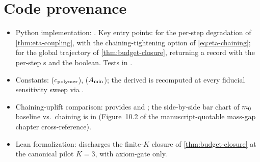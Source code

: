 \section{Code provenance}
\label{sec:sigma-hat-codeanchor}

\begin{itemize}
  \item Python implementation:
    .  Key entry
    points:  for the per-step degradation
    of \cref{thm:eta-coupling}, with the chaining-tightening
    option of \eqref{eq:eta-chaining};
     for the global trajectory of
    \cref{thm:budget-closure}, returning a
     record with the per-step
    s and the 
    boolean.  Tests in
    .
  \item Constants: 
    ($c_{\mathrm{polymer}}$),  ($A_{\min}$); the derived
     is recomputed at every
    fiducial sensitivity sweep via
    .
  \item Chaining-uplift comparison:
     provides
     and
    ; the
    side-by-side bar chart of $m_0$ baseline vs.\ chaining is
    in 
    (Figure~10.2 of the manuscript-quotable mass-gap chapter
    cross-reference).
  \item Lean formalization:
    discharges the finite-$K$ closure of \cref{thm:budget-closure}
    at the canonical pilot $K = 3$, with axiom-gate
    \codepath{[propext]} only.
\end{itemize}
